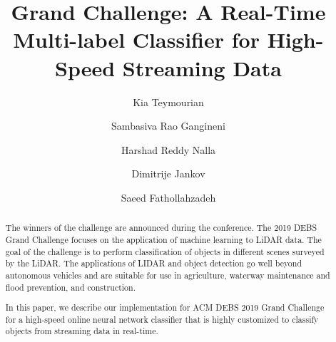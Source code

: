 \documentclass[sigconf]{acmart}
\begin{document}
%
\title{Grand Challenge: A Real-Time Multi-label Classifier for High-Speed Streaming Data}

%


\author{Kia Teymourian}

\author{Sambasiva Rao Gangineni}

\author{Harshad Reddy Nalla}

\author{Dimitrije Jankov}

\author{Saeed Fathollahzadeh}



%
\renewcommand{\shortauthors}{Kia Teymourian, et al.}

%
\begin{abstract}
The winners of the challenge are announced during the conference. The 2019 DEBS Grand Challenge focuses on the application of machine learning to LiDAR data. The goal of the challenge is to perform classification of objects in different scenes surveyed by the LiDAR. The applications of LIDAR and object detection go well beyond autonomous vehicles and are suitable for use in agriculture, waterway maintenance and flood prevention, and construction.

In this paper, we describe our implementation for ACM DEBS 2019 Grand Challenge for a high-speed online neural network classifier that is highly customized to classify objects from streaming data in real-time.
\end{abstract}
\end{document}
